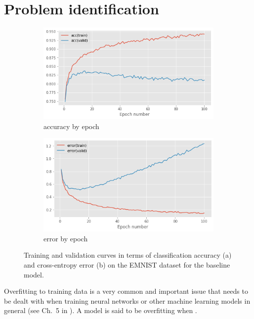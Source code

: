 \documentclass{article}
\begin{document}
\section{Problem identification}
\label{sec:task1}

\begin{figure}[t]
    \centering
    \begin{subfigure}{\linewidth}
        \includegraphics[width=\linewidth]{figures/accuracy_IHO_withrelu.png}
        \caption{accuracy by epoch}
        \label{fig:example_acccurves}
    \end{subfigure} 
    \begin{subfigure}{\linewidth}
        \centering
        \includegraphics[width=\linewidth]{figures/error_IHO_withrelu.png}
        \caption{error by epoch}
        \label{fig:example_errorcurves}
    \end{subfigure} 
    \caption{Training and validation curves in terms of classification accuracy (a) and cross-entropy error (b) on the EMNIST dataset for the baseline model.}
    \label{fig:example}
\end{figure} 

Overfitting to training data is a very common and important issue that needs to be dealt with when training neural networks or other machine learning models in general (see Ch.~5 in \citealt{Goodfellow-et-al-2016}).
A model is said to be overfitting when \questionFive.
\end{document}
